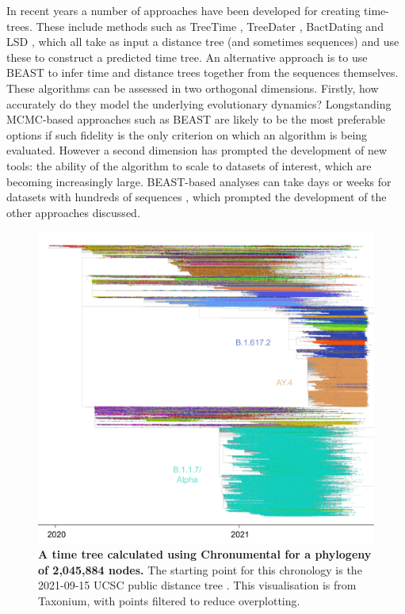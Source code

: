 In recent years a number of approaches have been developed for creating time-trees. These include methods such as TreeTime \citep{Sagulenko2018-kr}, TreeDater \citep{Volz2017-le},  BactDating \citep{Didelot2018-vf} and LSD \citep{To2016-cw} , which all take as input a distance tree (and sometimes sequences) and use these to construct a predicted time tree. An alternative approach is to use BEAST \citep{Suchard2018-ma} to infer time and distance trees together from the sequences themselves. These algorithms can be assessed in two orthogonal dimensions. Firstly, how accurately do they model the underlying evolutionary dynamics? Longstanding MCMC-based approaches such as BEAST are likely to be the most preferable options if such fidelity is the only criterion on which an algorithm is being evaluated. However a second dimension has prompted the development of new tools: the ability of the algorithm to scale to datasets of interest, which are becoming increasingly large. BEAST-based analyses can take days or weeks for datasets with hundreds of sequences \citep{Sagulenko2018-kr}, which prompted the development of the other approaches discussed.

\begin{figure}[t]
\centering
\includegraphics[width=1\linewidth]{Figures/timetree.pdf}
\caption{\textbf{A time tree calculated using Chronumental for a phylogeny of 2,045,884 nodes.} The starting point for this chronology is the 2021-09-15 UCSC public distance tree  \citep{McBroome2021-fn}. This visualisation is from Taxonium, with points  filtered to reduce overplotting.
}
\label{publictree}
\end{figure}

